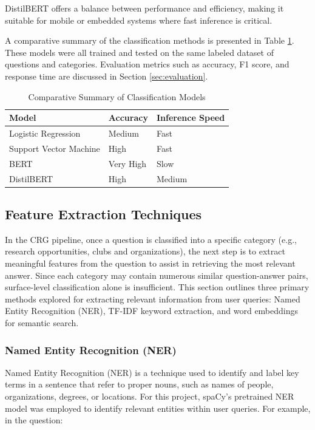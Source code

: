 \documentclass[conference]{IEEEtran}
\begin{document}
DistilBERT offers a balance between performance and efficiency, making it suitable for mobile or embedded systems where fast inference is critical.

A comparative summary of the classification methods is presented in Table \ref{tab:classification_comparison}.
These models were all trained and tested on the same labeled dataset of questions and categories. 
Evaluation metrics such as accuracy, F1 score, and response time are discussed in Section \ref{sec:evaluation}.

\begin{table}[!ht]
    \centering
    \caption{Comparative Summary of Classification Models}
    \label{tab:classification_comparison}
    \begin{tabular}{l|l|l}
        \toprule
        \textbf{Model}         & \textbf{Accuracy}         & \textbf{Inference Speed} \\
        \midrule
        Logistic Regression & Medium & Fast \\
        Support Vector Machine & High & Fast \\
        BERT                & Very High & Slow \\
        DistilBERT          & High & Medium \\
        \bottomrule
    \end{tabular}
\end{table}

\subsection{Feature Extraction Techniques}
In the CRG pipeline, once a question is classified into a specific category (e.g., research opportunities, clubs and organizations), the next step is to extract meaningful features from the question to assist in retrieving the most relevant answer. 
Since each category may contain numerous similar question-answer pairs, surface-level classification alone is insufficient. 
This section outlines three primary methods explored for extracting relevant information from user queries: Named Entity Recognition (NER), TF-IDF keyword extraction, and word embeddings for semantic search.

\subsubsection{Named Entity Recognition (NER)}
Named Entity Recognition (NER) is a technique used to identify and label key terms in a sentence that refer to proper nouns, such as names of people, organizations, degrees, or locations. 
For this project, spaCy's pretrained NER model \cite{b14} was employed to identify relevant entities within user queries. For example, in the question:
\end{document}
